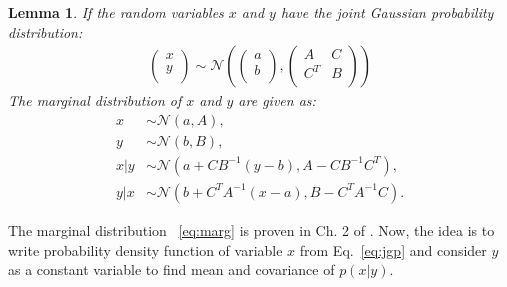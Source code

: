 \documentclass[12pt]{article}
\newtheorem{lemma}[theorem]{Lemma}
\begin{document}
\begin{enumerate}[label=\arabic*)]
        \begin{lemma} \label{lem:1}
        If the random variables $x$ and $y$ have the joint Gaussian probability distribution:
        \begin{align} \label{eq:jgp}
            \left(  \begin{array}{c}
                x \\
                y \\
            \end{array}  \right) 
            \sim\mathcal{N} \left( \left( {\begin{array}{c}
                 a \\
                 b \\
            \end{array} } \right), 
            \left( {\begin{array}{cc}
                A & C \\
                C^T & B \\
            \end{array} } \right) \right)
        \end{align}
        The marginal distribution of $x$ and $y$ are given as:
        \begin{subequations} \label{eq:marg}
        \begin{align} 
            x &\sim \mathcal{N}(a, A), \\
            y &\sim \mathcal{N}(b, B), \\
            x|y  &\sim \mathcal{N}(a+CB^{-1}(y-b),A-CB^{-1}C^T), \\
            y|x  &\sim \mathcal{N}(b+C^TA^{-1}(x-a),B-C^TA^{-1}C).
        \end{align}
        \end{subequations}
        \end{lemma}
        
        The marginal distribution ~\eqref{eq:marg} is proven in Ch. 2 of \cite{bishop2006pattern}. Now, the idea is to write probability density function of variable $x$ from Eq.~\eqref{eq:jgp} and consider $y$ as a constant variable to find mean and covariance of $p(x|y)$.
        

\end{enumerate}
\end{document}

